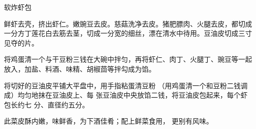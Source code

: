 \begin{recipe}{软炸虾包}

\ingredients




\cooking

\step 鲜虾去壳，挤出虾仁。嫩豌豆去皮。慈菇洗净去皮。猪肥膘肉、火腿去皮，都切成一分方丁莲花白去筋去茎，切成一分宽的细丝，漂在清水中待用。豆油皮切成三寸见夺的片。

\step 将鸡蛋清一个与干豆粉三钱在大碗中拌匀，再将虾仁、肉丁、火腿丁、豌豆等一起放入，加盐、料酒、味精、胡椒茴等拌勾成为馅。

将切好的豆油皮平铺大平盘中，用手指粘蛋清豆粉 （用鸡蛋清一个和豆粉二钱调成）均匀地抹在豆油皮上、每 张豆油皮中央放馅二钱，将豆油皮包起来，每个虾包长约七 分、直径约五分。

\notes

此菜皮酥内嫩，味鲜香，为下酒佳肴；配上鲜菜食用， 更别有风味。

\end{recipe}

